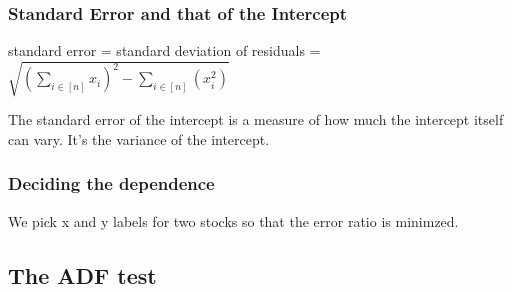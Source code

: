 \documentclass{article}
\begin{document}
\subsubsection{Standard Error and that of the Intercept}
\begin{center}
    standard error = standard deviation of residuals = $\sqrt{(\sum_{i\in [n]}{x_i})^2 - \sum_{i \in [n]}{(x_i^2)}}$
\end{center}
The standard error of the intercept is a measure of how much the intercept itself
can vary. It's the variance of the intercept.
\subsubsection{Deciding the dependence}
We pick x and y labels for two stocks so that the error ratio is minimzed.
\subsection{The ADF test}
\end{document}
